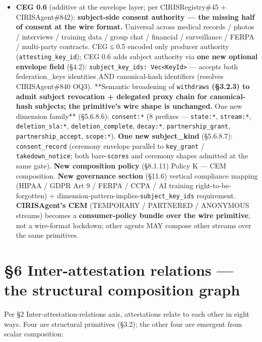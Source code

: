 \documentclass[11pt]{article}
\begin{document}
\begin{itemize}
\item \textbf{CEG 0.6} (additive at the envelope layer; per CIRISRegistry\#45 + CIRISAgent\#842): \textbf{subject-side consent authority — the missing half of consent at the wire format.} Universal across medical records / photos / interviews / training data / group chat / financial / surveillance / FERPA / multi-party contracts. CEG ≤ 0.5 encoded only producer authority (\texttt{attesting\_key\_id}); CEG 0.6 adds subject authority via \textbf{one new optional envelope field} (§4.2): \texttt{subject\_key\_ids: Vec<KeyId>} — accepts both federation\_keys identities AND canonical-hash identifiers (resolves CIRISAgent\#840 OQ3). **Semantic broadening of \texttt{withdraws}\textbf{ (§3.2.3) to admit subject revocation + delegated proxy chain for canonical-hash subjects; the primitive's wire shape is unchanged. }One new dimension family** (§5.6.8.6): \texttt{consent:*} (8 prefixes — \texttt{state:*}, \texttt{stream:*}, \texttt{deletion\_sla:*}, \texttt{deletion\_complete}, \texttt{decay:*}, \texttt{partnership\_grant}, \texttt{partnership\_accept}, \texttt{scope:*}). \textbf{One new subject\_kind} (§5.6.8.7): \texttt{consent\_record} (ceremony envelope parallel to \texttt{key\_grant} / \texttt{takedown\_notice}; both bare-\texttt{scores} and ceremony shapes admitted at the same gate). \textbf{New composition policy} (§8.1.11) Policy K — CEM composition. \textbf{New governance section} (§11.6) vertical compliance mapping (HIPAA / GDPR Art 9 / FERPA / CCPA / AI training right-to-be-forgotten) + dimension-pattern-implies-\texttt{subject\_key\_ids} requirement. \textbf{CIRISAgent's CEM} (TEMPORARY / PARTNERED / ANONYMOUS streams) becomes a \textbf{consumer-policy bundle over the wire primitive}, not a wire-format lockdown; other agents MAY compose other streams over the same primitives.
\end{itemize}





\clearpage


\section*{§6 Inter-attestation relations — the structural composition graph}


Per §2 Inter-attestation-relations axis, attestations relate to each other in eight ways. Four are structural primitives (§3.2); the other four are emergent from scalar composition:
\end{document}
